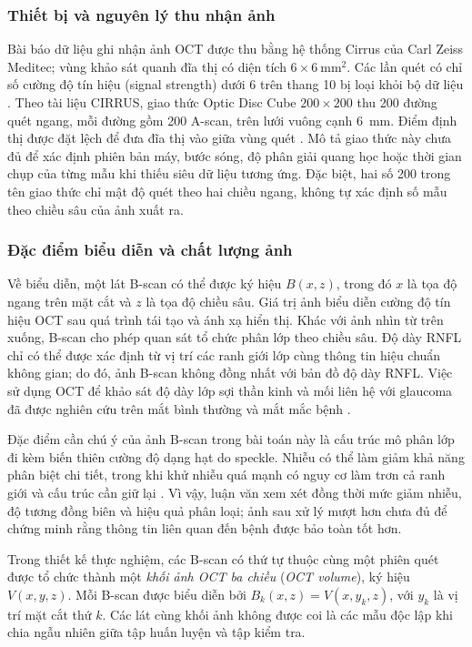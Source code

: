 \documentclass[14pt,a4paper,oneside]{extreport}
\begin{document}
\subsubsection{Thiết bị và nguyên lý thu nhận ảnh}
Bài báo dữ liệu ghi nhận ảnh OCT được thu bằng hệ thống Cirrus của
Carl Zeiss Meditec; vùng khảo sát quanh đĩa thị có diện tích
$6\times6~\mathrm{mm}^2$. Các lần quét có chỉ số cường độ tín hiệu (signal strength) dưới 6 trên
thang 10 bị loại khỏi bộ dữ liệu \cite{luo2024harvardgf}.
Theo tài liệu CIRRUS, giao thức Optic Disc Cube $200\times200$ thu
200 đường quét ngang, mỗi đường gồm 200 A-scan, trên lưới vuông
cạnh 6~mm. Điểm định thị được đặt lệch để đưa đĩa thị vào giữa vùng
quét \cite{zeiss2015cirrus}. Mô tả giao thức này chưa đủ để xác định
phiên bản máy, bước sóng, độ phân giải quang học hoặc thời gian chụp
của từng mẫu khi thiếu siêu dữ liệu tương ứng.
Đặc biệt, hai số 200 trong tên giao thức chỉ mật độ quét theo hai
chiều ngang, không tự xác định số mẫu theo chiều sâu của ảnh xuất ra.

\subsubsection{Đặc điểm biểu diễn và chất lượng ảnh}
Về biểu diễn, một lát B-scan có thể được ký hiệu $B(x,z)$, trong đó $x$
là tọa độ ngang trên mặt cắt và $z$ là tọa độ chiều sâu. Giá trị ảnh
biểu diễn cường độ tín hiệu OCT sau quá trình tái tạo và ánh xạ hiển
thị. Khác với ảnh nhìn từ trên
xuống, B-scan cho phép quan sát tổ chức phân lớp theo chiều sâu.
Độ dày RNFL chỉ có thể được xác định từ vị trí các ranh giới lớp cùng
thông tin hiệu chuẩn không gian; do đó, ảnh B-scan không đồng nhất với bản
đồ độ dày RNFL. Việc sử dụng OCT để khảo sát độ dày lớp sợi thần kinh
và mối liên hệ với glaucoma đã được nghiên cứu trên mắt bình thường và
mắt mắc bệnh \cite{guedes2003oct}.

Đặc điểm cần chú ý của ảnh B-scan trong bài toán này là cấu trúc mô
phân lớp đi kèm biến thiên cường độ dạng hạt do speckle. Nhiễu có thể
làm giảm khả năng phân biệt chi tiết, trong khi khử nhiễu quá mạnh có
nguy cơ làm trơn cả ranh giới và cấu trúc cần giữ lại \cite{aum2015}.
Vì vậy, luận văn xem xét đồng thời mức giảm nhiễu, độ tương đồng biên
và hiệu quả phân loại; ảnh sau xử lý mượt hơn chưa đủ để chứng minh rằng
thông tin liên quan đến bệnh được bảo toàn tốt hơn.

Trong thiết kế thực nghiệm, các B-scan có thứ tự thuộc cùng một phiên
quét được tổ chức thành một \textit{khối ảnh OCT ba chiều}
(\textit{OCT volume}), ký hiệu $V(x,y,z)$. 
Mỗi B-scan được biểu diễn bởi $B_k(x,z)=V(x,y_k,z)$,
với $y_k$ là vị trí mặt cắt thứ $k$. Các lát cùng khối ảnh không được coi là các mẫu độc lập khi chia ngẫu nhiên giữa tập huấn luyện và tập kiểm tra.
\end{document}
